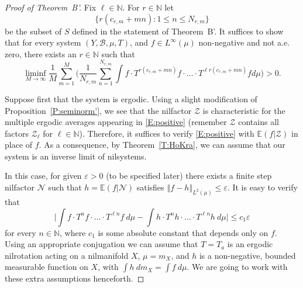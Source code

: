 \documentclass[11pt]{amsart}
\newcommand{\cZ}{\mathcal{Z}}
\newcommand{\E}{\mathbb{E}}
\newcommand{\N}{\mathbb{N}}
\newcommand{\norm}[1]{\left\Vert #1\right\Vert}
\theoremstyle{plain}
\theoremstyle{definition}
\theoremstyle{remark}
\begin{document}
\begin{proof}[Proof of Theorem~B']
  Fix $\ell\in\N$. For $r\in\N$ let
$$
\{r(c_{r,m}+mn)\colon 1\leq
  n\leq N_{r,m}\}
  $$
be the subset of $S$ defined
  in the statement of Theorem~B'. It suffices to show that for every system
  $(Y,\mathcal{B},\mu,T)$, and $f\in L^\infty(\mu)$ non-negative and
  not a.e. zero, there exists an $r\in\N$ such that
  \begin{equation}\label{E:positive}
    \liminf_{M\to\infty} \frac{1}{M}\sum_{m=1}^M\Big(\frac{1}{N_{r,m}}\sum_{n=1}^{N_{r,m}}   \int f \cdot T^{r(c_{r,m}+mn)}f
    \cdot\ldots\cdot T^{\ell r(c_{r,m}+mn)}f d\mu \Big)>0.
  \end{equation}

  Suppose first that the system is ergodic.
  Using a slight modification of
  Proposition~\ref{P:seminorm'}, we see that the nilfactor
  $\mathcal{Z}$ is characteristic for the multiple ergodic averages
  appearing in \eqref{E:positive} (remember $\cZ$ contains all factors
  $\cZ_\ell$ for $\ell\in\N$). Therefore,  it suffices to verify
  \eqref{E:positive} with $\E(f|\mathcal{Z})$ in place of $f$.  As a consequence,
   by
  Theorem~\ref{T:HoKra},  we can assume that our system
  is an inverse limit of  nilsystems.

  In this case, for given $\varepsilon>0$ (to be specified later)
  there exists a finite step nilfactor $\mathcal{N}$ such that
  $h=\E(f|\mathcal{N})$ satisfies $\norm{f-h}_{L^2(\mu)}\leq
  \varepsilon$.  It is easy to verify that
  \begin{equation}\label{E:appr}
    \Big|\int f\cdot T^{n}f\cdot\ldots\cdot T^{\ell n}f\ d\mu-\int h\cdot T^{n}h\cdot\ldots\cdot T^{\ell n}h\ d\mu\Big|\leq c_1\varepsilon
  \end{equation}
  for every $n\in\N$, where $c_1$ is some absolute constant that
  depends only on $f$.  Using an appropriate conjugation we can assume that $T=T_a$ is an ergodic  nilrotation acting on a nilmanifold $X$, $\mu=m_X$, and $h$ is a non-negative,  bounded measurable function on $X$,
  with $\int h \ dm_X=\int f \ d\mu$. We are going to work with these extra assumptions henceforth.


\end{proof}
\end{document}
